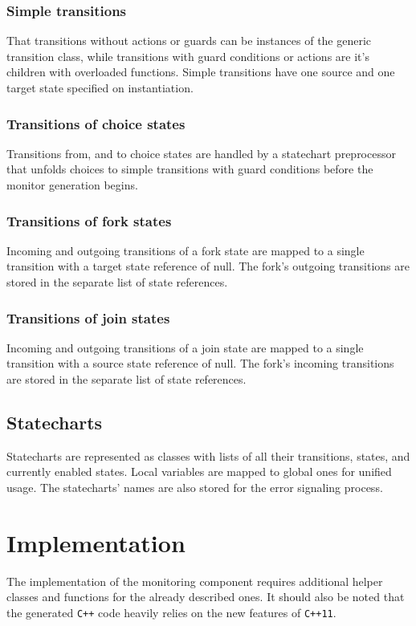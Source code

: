 \documentclass{book}
\begin{document}
{    \subsubsection{Simple transitions}
That transitions without actions or guards can be instances of the generic transition class, while transitions with guard conditions or actions are it's children with overloaded functions. Simple transitions have one source and one 
target state specified on instantiation.
    \subsubsection{Transitions of choice states}
Transitions from, and to choice states are handled by a statechart preprocessor that unfolds choices to simple transitions with guard conditions before the monitor generation begins.
    \subsubsection{Transitions of fork states}
Incoming and outgoing transitions of a fork state are mapped to a single transition with a target state reference of null. The fork's outgoing transitions are stored in the separate list of state references.
    \subsubsection{Transitions of join states}
Incoming and outgoing transitions of a join state are mapped to a single transition with a source state reference of null. The fork's incoming transitions are stored in the separate list of state references.
  \subsection{Statecharts}
Statecharts are represented as classes with lists of all their transitions, states, and currently enabled states. Local variables are mapped to global ones for unified usage. The statecharts' names are also stored for the error signaling process.
\section{Implementation}
The implementation of the monitoring component requires additional helper classes and functions for the already described ones. It should also be noted that the generated \verb!C++! code heavily relies on the new features of \verb!C++11!.
}
\end{document}

